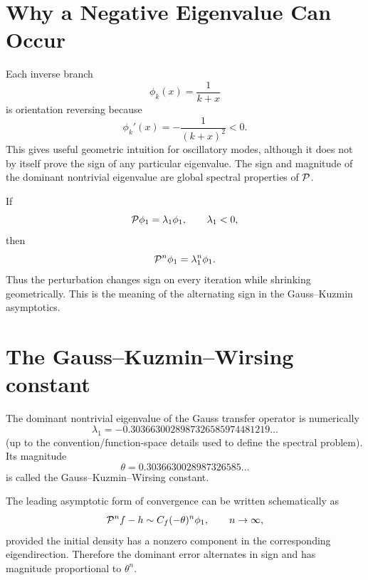 \documentclass[a4paper]{article}
\begin{document}
\section{Why a Negative Eigenvalue Can Occur}
Each inverse branch
\begin{equation}
 \phi_k(x)=\frac1{k+x}
\end{equation}
is orientation reversing because
\begin{equation}
 \phi_k'(x)=-\frac1{(k+x)^2}<0.
\end{equation}
This gives useful geometric intuition for oscillatory modes, although it does not by itself prove the sign of any particular eigenvalue. The sign and magnitude of the dominant nontrivial eigenvalue are global spectral properties of $\mathcal{P}$.

If
\begin{equation}
 \mathcal{P}\phi_1=\lambda_1\phi_1,
 \qquad \lambda_1<0,
\end{equation}
then
\begin{equation}
 \mathcal{P}^n\phi_1=\lambda_1^n\phi_1.
\end{equation}
Thus the perturbation changes sign on every iteration while shrinking geometrically. This is the meaning of the alternating sign in the Gauss--Kuzmin asymptotics.

\section{The Gauss--Kuzmin--Wirsing constant}
The dominant nontrivial eigenvalue of the Gauss transfer operator is numerically
\begin{equation}
 \boxed{\lambda_1=-0.3036630028987326585974481219\ldots}
\end{equation}
(up to the convention/function-space details used to define the spectral problem). Its magnitude
\begin{equation}
 \boxed{\theta=0.3036630028987326585\ldots}
\end{equation}
is called the Gauss--Kuzmin--Wirsing constant.

The leading asymptotic form of convergence can be written schematically as
\begin{equation}
 \mathcal{P}^n f-h
 \sim C_f(-\theta)^n\phi_1,
 \qquad n\to\infty,
\end{equation}
provided the initial density has a nonzero component in the corresponding eigendirection. Therefore the dominant error alternates in sign and has magnitude proportional to $\theta^n$.
\end{document}
